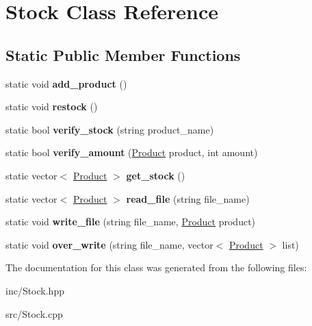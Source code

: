 \hypertarget{class_stock}{}\section{Stock Class Reference}
\label{class_stock}
\subsection*{Static Public Member Functions}
\begin{DoxyCompactItemize}
\item 
\mbox{\label{class_stock_a0d315ad78d90d7b44b03ee205901167c}} 
static void {\bfseries add\+\_\+product} ()
\item 
\mbox{\label{class_stock_a63c7f5ff4735d7c432513a184cc1f8ae}} 
static void {\bfseries restock} ()
\item 
\mbox{\label{class_stock_a723436b7d02d654b44240a8a9b299b53}} 
static bool {\bfseries verify\+\_\+stock} (string product\+\_\+name)
\item 
\mbox{\label{class_stock_a656392425435a9c6d4b2c11701bd874a}} 
static bool {\bfseries verify\+\_\+amount} (\hyperlink{class_product}{Product} product, int amount)
\item 
\mbox{\label{class_stock_a697aae3215e7c4f3f2de2ad54e8ec679}} 
static vector$<$ \hyperlink{class_product}{Product} $>$ {\bfseries get\+\_\+stock} ()
\item 
\mbox{\label{class_stock_aebee78521677e6ec8d3d3dafe07b2246}} 
static vector$<$ \hyperlink{class_product}{Product} $>$ {\bfseries read\+\_\+file} (string file\+\_\+name)
\item 
\mbox{\label{class_stock_adcde805388eaefb2da64afae6960c8d8}} 
static void {\bfseries write\+\_\+file} (string file\+\_\+name, \hyperlink{class_product}{Product} product)
\item 
\mbox{\label{class_stock_ab9eca0846f29c41181a63aff568c61be}} 
static void {\bfseries over\+\_\+write} (string file\+\_\+name, vector$<$ \hyperlink{class_product}{Product} $>$ list)
\end{DoxyCompactItemize}


The documentation for this class was generated from the following files\+:\begin{DoxyCompactItemize}
\item 
inc/Stock.\+hpp\item 
src/Stock.\+cpp\end{DoxyCompactItemize}
